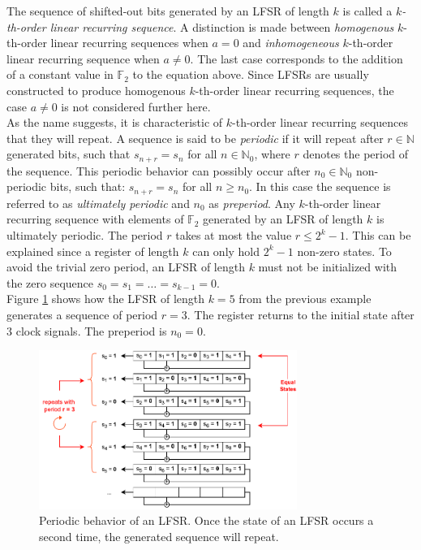 The sequence of shifted-out bits generated by an LFSR of length $k$ is called a \textit{$k$-th-order linear recurring sequence}. A distinction is made between \textit{homogenous} $k$-th-order linear recurring sequences when $a=0$ and \textit{inhomogeneous} $k$-th-order linear recurring sequence when $a\neq0$. The last case corresponds to the addition of a constant value in $\mathbb{F}_2$ to the equation above. \cite[p. 186]{Lidl.1986} Since LFSRs are usually constructed to produce homogenous $k$-th-order linear recurring sequences, the case $a\neq0$ is not considered further here. \\

As the name suggests, it is characteristic of $k$-th-order linear recurring sequences that they will repeat. A sequence is said to be \textit{periodic} if it will repeat after $r\in\mathbb{N}$ generated bits, such that $s_{n+r}=s_n$ for all $n\in\mathbb{N}_0$, where $r$ denotes the period of the sequence. This periodic behavior can possibly occur after $n_0\in\mathbb{N}_0$ non-periodic bits, such that: $s_{n+r}=s_n$ for all $n\ge{n_{0}}$. In this case the sequence is referred to as \textit{ultimately periodic} and $n_0$ as \textit{preperiod}. Any $k$-th-order linear recurring sequence with elements of $\mathbb{F}_2$ generated by an LFSR of length $k$ is ultimately periodic. The period $r$ takes at most the value $r\le2^{k}-1$. This can be explained since a register of length $k$ can only hold $2^{k}-1$ non-zero states. To avoid the trivial zero period, an LFSR of length $k$ must not be initialized with the zero sequence $s_0=s_1=\ldots=s_{k-1}=0$. \cite[p. 189]{Lidl.1986} \\

Figure \ref{fig:Figure_5} shows how the LFSR of length $k=5$ from the previous example generates a sequence of period $r=3$. The register returns to the initial state after $3$ clock signals. The preperiod is $n_0=0$.

\begin{figure}[h]
	\centering
	\includegraphics[width=0.75\textwidth]{carl/figures/figure_5_svg-raw.pdf}
	\caption{Periodic behavior of an LFSR. Once the state of an LFSR occurs a second time, the generated sequence will repeat.}
	\label{fig:Figure_5}
\end{figure}

